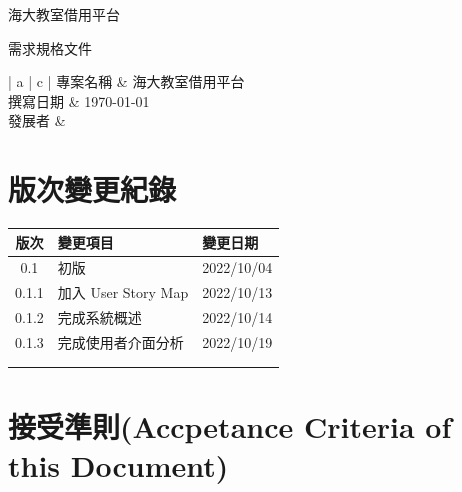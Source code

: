\documentclass{article}
\begin{document}
\begin{titlepage}
	\centering

	{\huge 海大教室借用平台}

	\vfill

	{\huge 需求規格文件}

	\vfill

	\begin{Large}
		\begin{center}
			\begin{tabular}{| a | c |}
				\hline
				專案名稱 & 海大教室借用平台               \\ \hline
				撰寫日期 & \today                 \\ \hline
				發展者  &  \\ \hline
			\end{tabular}
		\end{center}
	\end{Large}
\end{titlepage}


\section*{版次變更紀錄}

\begin{tabularx}{\textwidth}{| c | X | X |}
	\rowcolor{LightGray}
	\hline
	版次    & 變更項目              & 變更日期       \\ \hline
	0.1   & 初版                & 2022/10/04 \\ \hline
	0.1.1 & 加入 User Story Map & 2022/10/13 \\ \hline
	0.1.2 & 完成系統概述            & 2022/10/14 \\ \hline
	0.1.3 & 完成使用者介面分析         & 2022/10/19 \\ \hline
	      &                   &            \\ \hline
	      &                   &            \\ \hline
\end{tabularx}

\newpage

\begin{center}
	\tableofcontents
\end{center}

\newpage

\section[接受準則(ACCEPTANCE CRITERIA OF THIS DOCUMENT)]{接受準則(Accpetance Criteria of this Document)}
\end{document}
